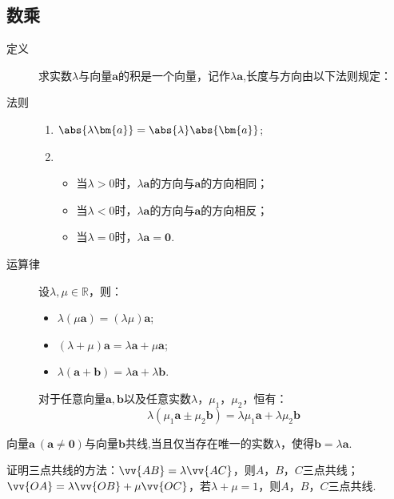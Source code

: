   \subsection{数乘}
    \begin{description}
      \item[定义] 求实数$ \lambda $与向量$\bm{a}$的积是一个向量，记作$\lambda\bm{a}$,长度与方向由以下法则规定：
      \item[法则]
        \begin{enumerate}[label=\arabic*)]
          \item $\abs{\lambda \bm{a}}=\abs{\lambda}\abs{\bm{a}} $;
          \item
            \begin{itemize}
              \item 当$ \lambda>0 $时，$ \lambda\bm{a} $的方向与$\bm{a}$的方向相同；
              \item 当$ \lambda<0 $时，$ \lambda\bm{a} $的方向与$\bm{a}$的方向相反；
              \item 当$ \lambda=0 $时，$ \lambda\bm{a}=\bm 0 $.
            \end{itemize}
        \end{enumerate}
      \item[运算律]
        设$\lambda,\mu\in\mathbb{R}$，则：\par
        \begin{itemize}
            \item $\lambda(\mu\bm{a})=(\lambda\mu)\bm{a}$;
            \item $(\lambda+\mu)\bm{a}=\lambda\bm{a}+\mu\bm{a}$;
            \item $\lambda(\bm{a}+\bm{b})=\lambda\bm{a}+\lambda\bm{b}$.
        \end{itemize}
      对于任意向量$\bm a,\bm b$以及任意实数$\lambda$，$\mu_1$，$\mu_2$，恒有：
      \[\lambda({\mu_1\bm a}\pm{\mu_2\bm b})={\lambda\mu_1\bm a}+{\lambda\mu_2\bm b}\]
    \end{description}
    \begin{Theorem}[向量共线定理]
      向量$\bm{a}~(\bm{a}\ne\bm{0})$与向量$\bm{b}$共线,当且仅当存在唯一的实数$ \lambda $，使得$\bm{b}=\lambda\bm{a}$.
    \end{Theorem}
    {\kaishu
     证明三点共线的方法：$\vv{AB}=\lambda\vv{AC}$，则$A$，$B$，$C$三点共线；$\vv{OA}=\lambda\vv{OB}+\mu\vv{OC}$，若$\lambda+\mu=1$，则$A$，$B$，$C$三点共线.
    }
  \clearpage
